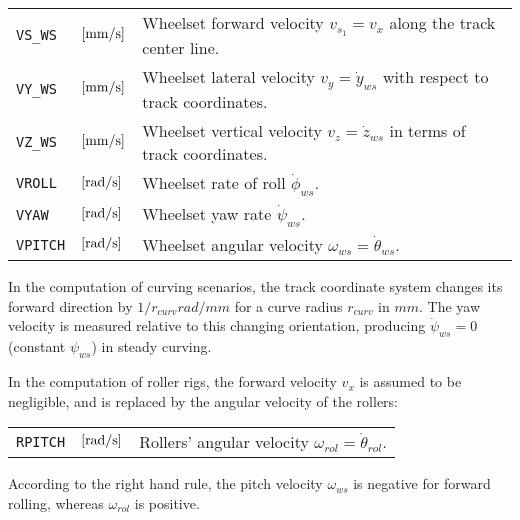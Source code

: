\documentclass[12pt]{report}
\renewcommand{\magenta}[1]{}
\newenvironment{inputvars}{\vspace{0.4\baselineskip}%

\begin{tabular}{>{\raggedright}p{22mm}p{19mm}p{113mm}}}{
\end{tabular}

}
\newcommand{\inpvar}[3]{{\small\tt #1} & $#2$ & #3 \\[1ex]}
\begin{document}
\magenta{Extensions for ${\tt F}_1=1\text{--}2$ are under development,
prescribing $F_{x(ws)}$ or $M_{y(ws)}$ (on the rail!) instead of
$\omega_{ws}$. These are targeted mainly at small (relative) forces,
little precautions are taken to prevent solver divergence.}
\begin{inputvars}
\inpvar{VS\_WS}{\bunit{mm/s}}{Wheelset forward velocity $v_{s_1}=v_x$ along
        the track center line.}
\inpvar{VY\_WS}{\bunit{mm/s}}{Wheelset lateral velocity $v_y=\dot{y}_{ws}$ with
        respect to track coordinates.}
\inpvar{VZ\_WS}{\bunit{mm/s}}{Wheelset vertical velocity $v_z=\dot{z}_{ws}$ 
        in terms of track coor\-di\-nates.}
\inpvar{VROLL}{\bunit{rad/s}}{Wheelset rate of roll $\dot{\phi}_{ws}$.}
\inpvar{VYAW}{\bunit{rad/s}}{Wheelset yaw rate $\dot{\psi}_{ws}$.}
\inpvar{VPITCH}{\bunit{rad/s}}{Wheelset angular velocity $\omega_{ws}=
        \dot{\theta}_{ws}$. \magenta{Output when ${\tt F}_1=1$ or $2$.}}
\end{inputvars}
In the computation of curving scenarios, the track coordinate system
changes its forward direction by $1/r_{curv}\unit{rad/mm}$ for a curve
radius $r_{curv}$ in $\unit{mm}$. The yaw velocity is measured relative to
this changing orientation, producing $\dot{\psi}_{ws}=0$ (constant
$\psi_{ws}$) in steady curving.

In the computation of roller rigs, the forward velocity $v_x$ is assumed to
be negligible, and is replaced by the angular velocity of the rollers:
\begin{inputvars}
\inpvar{RPITCH}{\bunit{rad/s}}{Rollers' angular velocity $\omega_{rol}=
        \dot{\theta}_{rol}$.}
\end{inputvars}
According to the right hand rule, the pitch velocity $\omega_{ws}$ is
negative for forward rolling, whereas $\omega_{rol}$ is positive.
\end{document}
